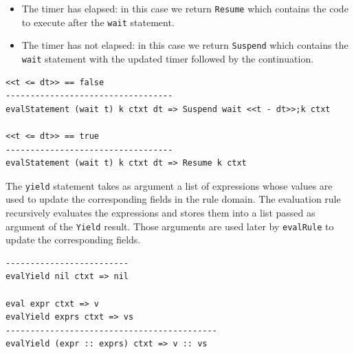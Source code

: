 \begin{itemize}
\item The timer has elapsed: in this case we return \texttt{Resume} which contains the code to execute after the \texttt{wait} statement.
\item The timer has not elapsed: in this case we return \texttt{Suspend} which contains the \texttt{wait} statement with the updated timer followed by the continuation.
\end{itemize}


\begin{lstlisting}
<<t <= dt>> == false
----------------------------------
evalStatement (wait t) k ctxt dt => Suspend wait <<t - dt>>;k ctxt

<<t <= dt>> == true
----------------------------------
evalStatement (wait t) k ctxt dt => Resume k ctxt
\end{lstlisting}

\noindent
The \texttt{yield} statement takes as argument a list of expressions whose values are used to update the corresponding fields in the rule domain. The evaluation rule recursively evaluates the expressions and stores them into a list passed as argument of the \texttt{Yield} result. Those arguments are used later by \texttt{evalRule} to update the corresponding fields.

\begin{lstlisting}
-------------------------
evalYield nil ctxt => nil

eval expr ctxt => v
evalYield exprs ctxt => vs
-------------------------------------------
evalYield (expr :: exprs) ctxt => v :: vs
\end{lstlisting}